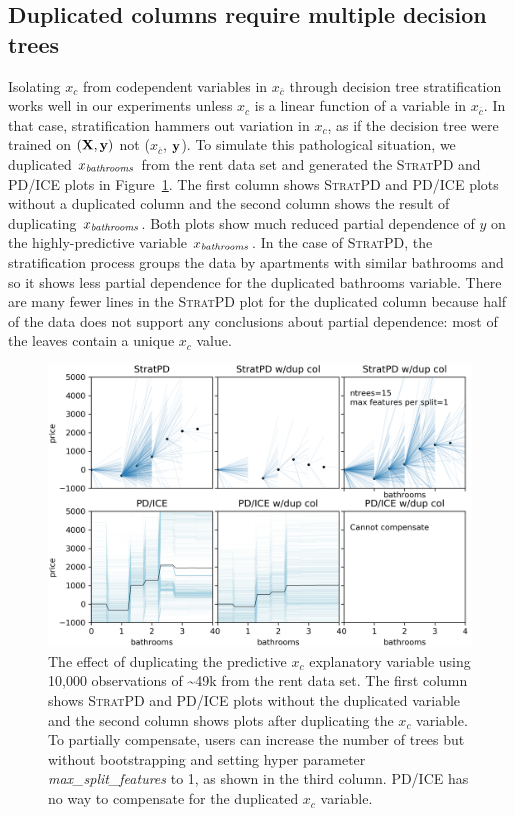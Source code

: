 \documentclass[12pt]{article}
\newcommand{\figref}[1]{Figure~\ref{#1}}
\newcommand{\spd}{\fontfamily{cmr}\textsc{\small StratPD}}
\newcommand{\xnc}{$x_{\overline{c}}$}
\begin{document}
\subsection{Duplicated columns require multiple decision trees}\label{sec:dup}

Isolating $x_c$ from codependent variables in \xnc{} through decision tree stratification works well in our experiments unless $x_c$ is a linear function of a variable in \xnc{}. In that case, stratification hammers out variation in $x_c$, as if the decision tree were trained on $(\bf X, y)$ not (\xnc, $\bf y$). To simulate this pathological situation, we duplicated $x_{\it bathrooms}$ from the rent data set and generated the \spd{} and PD/ICE plots in \figref{fig:baths_dup}. The first column shows \spd{} and PD/ICE plots without a duplicated column and the second column shows the result of duplicating $x_{\it bathrooms}$. Both plots show much reduced partial dependence of $y$ on the highly-predictive variable $x_{\it bathrooms}$. In the case of \spd{}, the stratification process groups the data by apartments with similar bathrooms and so it shows less partial dependence for the duplicated bathrooms variable.   There are many fewer lines in the \spd{} plot for the duplicated column because half of the data does not support any conclusions about partial dependence: most of the leaves contain a unique $x_c$ value.

\begin{figure}[htbp]
\begin{center}
\includegraphics[scale=0.6]{images/bathrooms_vs_price_dup.png}
\caption{The effect of duplicating the predictive $x_c$ explanatory variable using 10,000 observations of \textasciitilde49k from the rent data set. The first column shows \spd{} and PD/ICE plots without the duplicated variable and the second column shows plots after duplicating the $x_c$ variable. To partially compensate, users can increase the number of trees but without bootstrapping and setting hyper parameter {\it max\_split\_features} to 1, as shown in the third column. PD/ICE has no way to compensate for the duplicated $x_c$ variable.}
\label{fig:baths_dup}
\end{center}
\end{figure}
\end{document}
